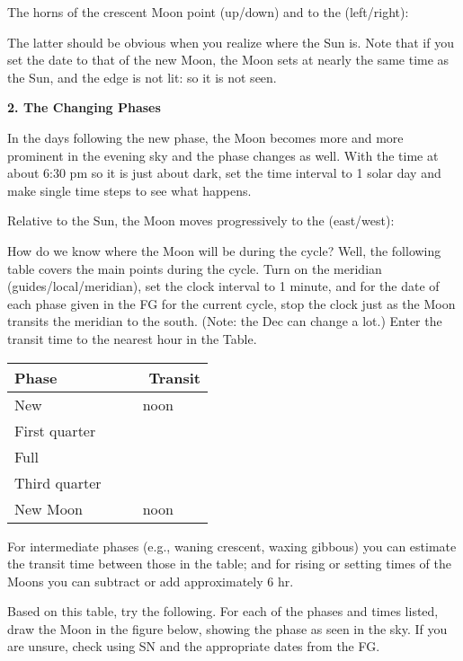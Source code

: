 \documentclass[12pt]{article}
\begin{document}
The horns of the crescent Moon point (up/down) and to the (left/right): \makebox[2cm]{\hrulefill}

\medskip\noindent
The latter should be obvious when you realize where the Sun is. Note
that if you set the date to that of the new Moon, the
Moon sets at nearly the same time as the Sun, and the edge is not lit:
so it is not seen.

\bigskip
\noindent
{\bf 2. The Changing Phases}

\medskip \noindent
In the days following the new phase, the Moon becomes more and more
prominent in the evening sky and the phase changes as well.
With the time at about 6:30 pm so it is just about dark, set the time
interval to 1 solar day and make single time steps to see what happens.

\medskip
Relative to the Sun, the Moon moves progressively to the (east/west): \makebox[2cm]{\hrulefill}

\medskip
How do we know where the Moon will be during the cycle? Well, the
following table covers the main points during the cycle. Turn on the
meridian (guides/local/meridian), set the clock interval to 1 minute,
and for the date of each phase given in the FG for the current cycle,
stop the clock just as the Moon transits the meridian to the
south. (Note: the Dec can change a lot.) Enter the transit time to the
nearest hour in the Table.

\bigskip
\begin{center}
\begin{tabular}{lc} \hline
Phase  & \ \ \ \ Transit  \\
 \hline
New   &    noon    \\ \hline
First quarter   &        \\ \hline
Full   &    \\ \hline
Third quarter   &        \\ \hline
New Moon    &  noon     \\ \hline
\end{tabular}
\end{center}

For intermediate phases (e.g., waning crescent, waxing gibbous) you
can estimate the transit time between those in the table; and for
rising or setting times of the Moons you can subtract or add
approximately 6 hr.

\bigskip
\noindent
Based on this table, try the following. For each of the phases and
times listed, draw the Moon in the figure below, showing the phase as
seen in the sky. If you are unsure, check using SN and the appropriate
dates from the FG.
\end{document}

